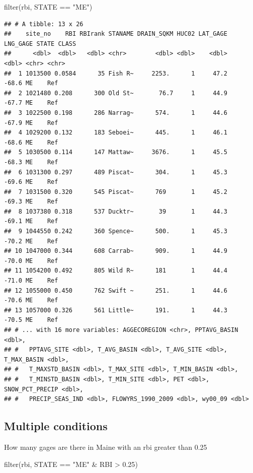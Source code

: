 \documentclass[
]{book}
\newenvironment{Shaded}{\begin{snugshade}}{\end{snugshade}}
\newcommand{\FloatTok}[1]{\textcolor[rgb]{0.00,0.00,0.81}{#1}}
\newcommand{\FunctionTok}[1]{\textcolor[rgb]{0.00,0.00,0.00}{#1}}
\newcommand{\NormalTok}[1]{#1}
\newcommand{\SpecialCharTok}[1]{\textcolor[rgb]{0.00,0.00,0.00}{#1}}
\newcommand{\StringTok}[1]{\textcolor[rgb]{0.31,0.60,0.02}{#1}}
\begin{document}
\begin{Shaded}
\begin{Highlighting}[]
\FunctionTok{filter}\NormalTok{(rbi, STATE }\SpecialCharTok{==} \StringTok{"ME"}\NormalTok{)}
\end{Highlighting}
\end{Shaded}

\begin{verbatim}
## # A tibble: 13 x 26
##    site_no    RBI RBIrank STANAME DRAIN_SQKM HUC02 LAT_GAGE LNG_GAGE STATE CLASS
##      <dbl>  <dbl>   <dbl> <chr>        <dbl> <dbl>    <dbl>    <dbl> <chr> <chr>
##  1 1013500 0.0584      35 Fish R~     2253.      1     47.2    -68.6 ME    Ref  
##  2 1021480 0.208      300 Old St~       76.7     1     44.9    -67.7 ME    Ref  
##  3 1022500 0.198      286 Narrag~      574.      1     44.6    -67.9 ME    Ref  
##  4 1029200 0.132      183 Seboei~      445.      1     46.1    -68.6 ME    Ref  
##  5 1030500 0.114      147 Mattaw~     3676.      1     45.5    -68.3 ME    Ref  
##  6 1031300 0.297      489 Piscat~      304.      1     45.3    -69.6 ME    Ref  
##  7 1031500 0.320      545 Piscat~      769       1     45.2    -69.3 ME    Ref  
##  8 1037380 0.318      537 Ducktr~       39       1     44.3    -69.1 ME    Ref  
##  9 1044550 0.242      360 Spence~      500.      1     45.3    -70.2 ME    Ref  
## 10 1047000 0.344      608 Carrab~      909.      1     44.9    -70.0 ME    Ref  
## 11 1054200 0.492      805 Wild R~      181       1     44.4    -71.0 ME    Ref  
## 12 1055000 0.450      762 Swift ~      251.      1     44.6    -70.6 ME    Ref  
## 13 1057000 0.326      561 Little~      191.      1     44.3    -70.5 ME    Ref  
## # ... with 16 more variables: AGGECOREGION <chr>, PPTAVG_BASIN <dbl>,
## #   PPTAVG_SITE <dbl>, T_AVG_BASIN <dbl>, T_AVG_SITE <dbl>, T_MAX_BASIN <dbl>,
## #   T_MAXSTD_BASIN <dbl>, T_MAX_SITE <dbl>, T_MIN_BASIN <dbl>,
## #   T_MINSTD_BASIN <dbl>, T_MIN_SITE <dbl>, PET <dbl>, SNOW_PCT_PRECIP <dbl>,
## #   PRECIP_SEAS_IND <dbl>, FLOWYRS_1990_2009 <dbl>, wy00_09 <dbl>
\end{verbatim}

\hypertarget{multiple-conditions}{%
\subsection{Multiple conditions}\label{multiple-conditions}}

How many gages are there in Maine with an rbi greater than 0.25

\begin{Shaded}
\begin{Highlighting}[]
\FunctionTok{filter}\NormalTok{(rbi, STATE }\SpecialCharTok{==} \StringTok{"ME"} \SpecialCharTok{\&}\NormalTok{ RBI }\SpecialCharTok{\textgreater{}} \FloatTok{0.25}\NormalTok{)}
\end{Highlighting}
\end{Shaded}
\end{document}
